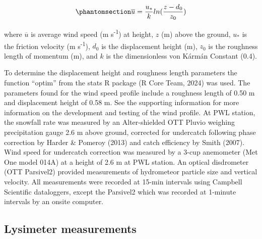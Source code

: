 \documentclass[
  letterpaper,
  DIV=11,
  numbers=noendperiod]{scrartcl}
\begin{document}
\begin{equation}\phantomsection\label{eq-log-wind-profile}{
\overline{u} = \frac{u_*}{k} ln(\frac{z - d_0}{z_0})
}\end{equation}

where \(\overline{u}\) is average wind speed (m s\textsuperscript{-1})
at height, \(z\) (m) above the ground, \(u_*\) is the friction velocity
(m s\textsuperscript{-1}), \(d_0\) is the displacement height (m),
\(z_0\) is the roughness length of momentum (m), and \(k\) is the
dimensionless von Kármán Constant (0.4).

To determine the displacement height and roughness length parameters the
function ``optim'' from the stats R package (R Core Team, 2024) was
used. The parameters found for the wind speed profile include a
roughness length of 0.50 m and displacement height of 0.58 m. See the
supporting information for more information on the development and
testing of the wind profile. At PWL station, the snowfall rate was
measured by an Alter-shielded OTT Pluvio weighing precipitation gauge
2.6 m above ground, corrected for undercatch following phase correction
by Harder \& Pomeroy (2013) and catch efficiency by Smith (2007). Wind
speed for undercatch correction was measured by a 3-cup anemometer (Met
One model 014A) at a height of 2.6 m at PWL station. An optical
disdrometer (OTT Parsivel2) provided measurements of hydrometeor
particle size and vertical velocity. All measurements were recorded at
15-min intervals using Campbell Scientific dataloggers, except the
Parsivel2 which was recorded at 1-minute intervals by an onsite
computer.

\subsection{Lysimeter measurements}\label{lysimeter-measurements}
\end{document}
